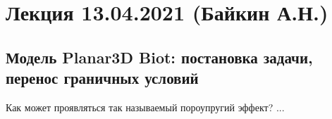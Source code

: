 \documentclass[main.tex]{subfiles}
\begin{document}

\section{Лекция 13.04.2021 (Байкин А.Н.)}

\subsection{Модель Planar3D Biot: постановка задачи, перенос граничных условий}

Как может проявляться так называемый пороупругий эффект?
...
\end{document}
